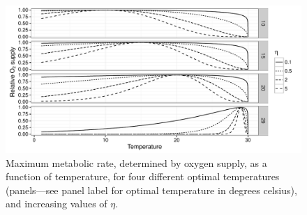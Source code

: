 

\begin{figure}
\includegraphics[width=\linewidth]{images/O2_fig-1} \caption[Maximum metabolic rate, determined by oxygen supply, as a function of temperature, for four different optimal temperatures (panels---see panel label for optimal temperature in degrees celsius), and increasing values of $\eta$]{Maximum metabolic rate, determined by oxygen supply, as a function of temperature, for four different optimal temperatures (panels---see panel label for optimal temperature in degrees celsius), and increasing values of $\eta$.}\label{fig:O2_fig}
\end{figure}


